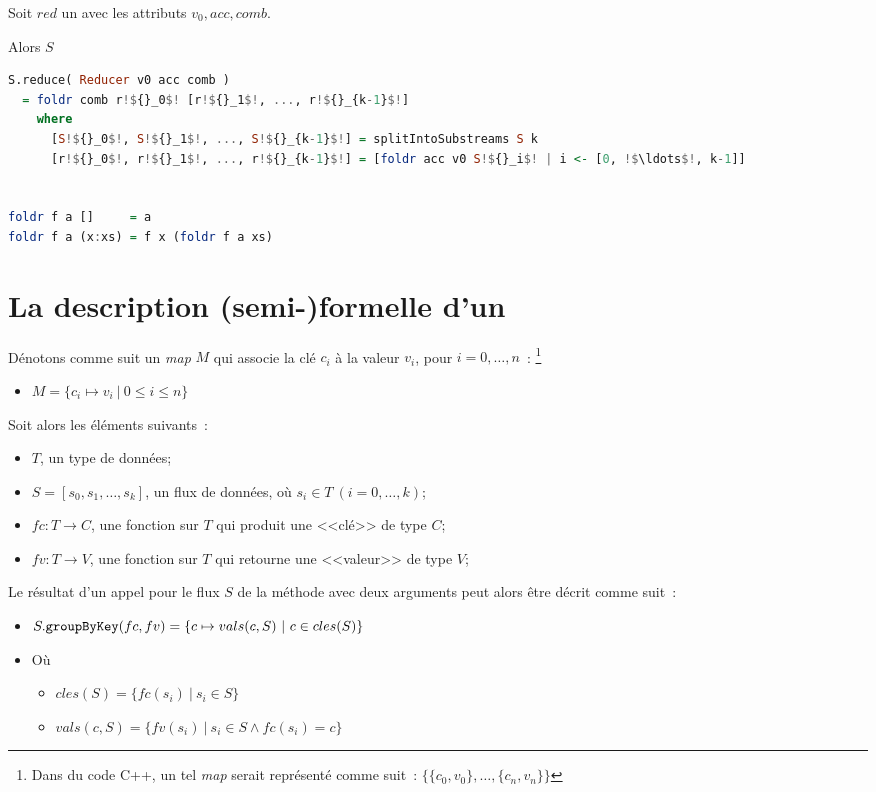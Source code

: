 Soit $red$ un  avec les attributs $v_0, acc, comb$.

Alors $S$


\begin{lstlisting}[language=haskell,escapechar=\!]
S.reduce( Reducer v0 acc comb )
  = foldr comb r!${}_0$! [r!${}_1$!, ..., r!${}_{k-1}$!]
    where
      [S!${}_0$!, S!${}_1$!, ..., S!${}_{k-1}$!] = splitIntoSubstreams S k
      [r!${}_0$!, r!${}_1$!, ..., r!${}_{k-1}$!] = [foldr acc v0 S!${}_i$! | i <- [0, !$\ldots$!, k-1]]


foldr f a []     = a
foldr f a (x:xs) = f x (foldr f a xs)
\end{lstlisting}



\section{La description (semi-)formelle d'un }
\label{DescriptionFormelleGroupByKey.ann}


D\'enotons comme suit un \emph{map} $M$ qui associe la cl\'e $c_i$ \`a
la valeur $v_i$, pour $i=0, \ldots, n$~:%
%
\footnote{Dans du code C++, un tel \emph{map} serait repr\'esent\'e
comme suit~: $\{\{c_0, v_0\}, \ldots, \{c_n, v_n\}\}$}
%
\begin{itemize}
\item $M = \{ c_i \mapsto v_i~\vert~0 \leq i \leq n \}$
\end{itemize}

Soit alors les \'el\'ements suivants~: 
\begin{itemize}
\item $T$, un type de donn\'ees;

\item $S = [s_0, s_1, \ldots, s_k]$, un flux de donn\'ees, o\`u $s_i
\in T~(i=0, \ldots, k)$;

\item $fc: T \rightarrow C$, une fonction sur  $T$ qui produit une
<<cl\'e>> de type $C$;

\item $fv: T \rightarrow V$, une fonction sur $T$ qui retourne une
<<valeur>> de type $V$;


\end{itemize}


Le r\'esultat d'un appel pour le flux $S$ de la m\'ethode
 avec deux arguments peut alors \^etre d\'ecrit comme
suit~:
%
\begin{itemize}
\item $S.{\tt groupByKey}(fc, fv) = \{ c \mapsto vals(c, S)~\vert~c \in
cles(S)\}$

\item[] O\`u
\begin{itemize}
\item $cles(S) = \{ fc(s_i)~\vert~s_i \in S \}$
\item $vals(c, S) = \{ fv(s_i)~\vert~ s_i\in S \wedge fc(s_i) = c\}$
\end{itemize}

\end{itemize}


